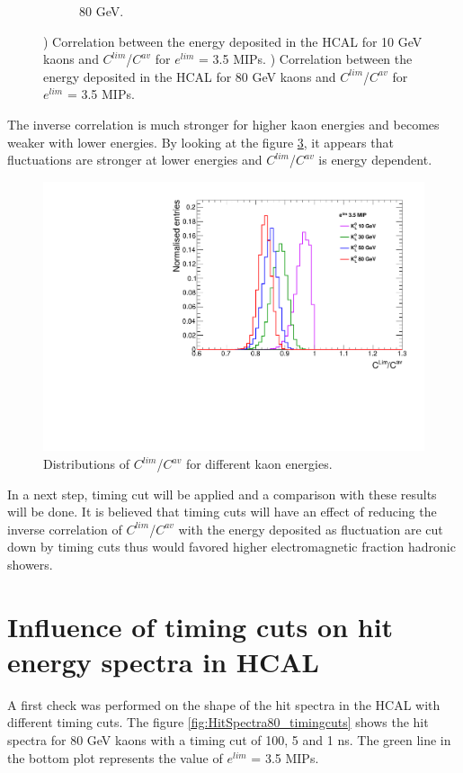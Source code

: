 \begin{figure}[htbp!]
\begin{subfigure}[t]{0.45\textwidth}
    \caption{80 GeV.} \label{fig:EhcalCLimCav80_100ns}
  \end{subfigure}
  \caption{) Correlation between the energy deposited in the HCAL for 10 GeV kaons and $C^{lim}$/$C^{av}$ for $e^{lim}$ = 3.5 MIPs. ) Correlation between the energy deposited in the HCAL for 80 GeV kaons and $C^{lim}$/$C^{av}$ for $e^{lim}$ = 3.5 MIPs.}
\end{figure}

The inverse correlation is much stronger for higher kaon energies and becomes weaker with lower energies. By looking at the figure \ref{fig:CLimCav_100ns}, it appears that fluctuations are stronger at lower energies and $C^{lim}$/$C^{av}$ is energy dependent.

\begin{figure}[htbp!]
  \centering
  \includegraphics[width=0.7\linewidth]{../Thesis_Plots/ILD/AdditionalPlots/Plots/CLimCav_100ns_SeveralEnergies.pdf}
  \caption{Distributions of $C^{lim}$/$C^{av}$ for different kaon energies.} \label{fig:CLimCav_100ns}
\end{figure}

In a next step, timing cut will be applied and a comparison with these results will be done. It is believed that timing cuts will have an effect of reducing the inverse correlation of $C^{lim}$/$C^{av}$ with the energy deposited as fluctuation are cut down by timing cuts thus would favored higher electromagnetic fraction hadronic showers.

\section{Influence of timing cuts on hit energy spectra in HCAL}

A first check was performed on the shape of the hit spectra in the HCAL with different timing cuts. The figure \ref{fig:HitSpectra80_timingcuts} shows the hit spectra for 80 GeV kaons with a timing cut of 100, 5 and 1 ns. The green line in the bottom plot represents the value of $e^{lim}$ = 3.5 MIPs.

